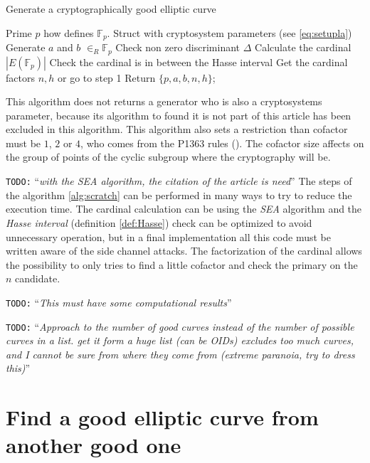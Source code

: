 \documentclass[10pt,a4paper,twoside]{llncs}
\newcommand{\todo}[1]{\texttt{\color{red}TODO:} ``\emph{#1}''}
\newcommand{\Fp}{\ensuremath{\mathbb{F}_p}}%
\begin{document}
\begin{algorithm}
\caption{Generate a cryptographically good elliptic curve}\label{alg:scratch}
\begin{algorithmic}[1]
\REQUIRE Prime $p$ how defines \Fp.
\ENSURE Struct with cryptosystem parameters (see \ref{eq:setupla})
\REPEAT
\STATE Generate $a$ and $b$ $\in_{R}$\Fp
\STATE Check non zero discriminant $\Delta$
\STATE Calculate the cardinal $\left| E\left(\mathbb{F}_{p}\right)\right|$ %
\STATE Check the cardinal is in between the Hasse interval
\STATE Get the cardinal factors $n,h$ or go to step 1
\STATE Return $\{p,a,b,n,h\}$;
\end{algorithmic}
\end{algorithm}%

This algorithm does not returns a generator who is also a cryptosystems parameter, because its algorithm to found it is not part of this article has been excluded in this algorithm. This algorithm also sets a restriction than cofactor must be $1$, $2$ or $4$, who comes from the P1363 rules (\cite{P1363}). The cofactor size affects on the group of points of the cyclic subgroup where the cryptography will be.

\todo{with the SEA algorithm, the citation of the article is need}
The steps of the algorithm \ref{alg:scratch} can be performed in many ways to try to reduce the execution time. The cardinal calculation can be using the \emph{SEA} algorithm  and the \emph{Hasse interval} (definition \ref{def:Hasse}) check can be optimized to avoid unnecessary operation, but in a final implementation all this code must be written aware of the side channel attacks. The factorization of the cardinal allows the possibility to only tries to find a little cofactor and check the primary on the $n$ candidate.

\todo{This must have some computational results}

\todo{Approach to the number of good curves instead of the number of possible curves in a list. get it form a huge list (can be OIDs) excludes too much curves, and I cannot be sure from where they come from (extreme paranoia, try to dress this)}
\cite{DAS_guide}%

\section{Find a good elliptic curve from another good one \label{sec:from_another}}
\end{document}
